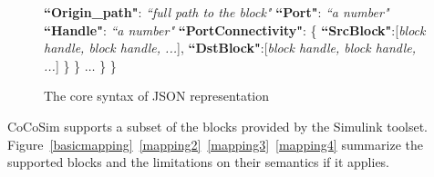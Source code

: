 \documentclass{article}
\begin{document}
\begin{figure}
\begin{algorithmic}
{\State {\ \ \ \ \ \ \ \ \ \ \ \ } \textbf{``Origin\_path"}: \textit{``full path to the block"} 
\State {\ \ \ \ \ \ \ \ \ \ \ \ } \textbf{``Port"}: \textit{``a number"} 
\State {\ \ \ \ \ \ \ \ \ \ \ \ } \textbf{``Handle"}: \textit{``a number"} 		   
\State {\ \ \ \ \ \ \ \ \ \ \ \ } \textbf{``PortConnectivity"}: \{ 
\State {\ \ \ \ \ \ \ \ \ \ \ \ \ \ \ \ } \textbf{``SrcBlock"}:[\textit{block handle, block handle, ...}], 
\State {\ \ \ \ \ \ \ \ \ \ \ \ \ \ \ \ } \textbf{``DstBlock"}:[\textit{block handle, block handle, ...}]		
\State {\ \ \ \ \ \ \ \ \ \ \ \ }\}	
\State {\ \ \ \ \ \ \ \ } \}
\State {\ \ \ \ \ \ \ \ } $\ldots$
\State {\ \ \ \ }\}
\State \}}
\end{algorithmic}
\caption{The core syntax of JSON representation}
\label{jsonsyntax}
\end{figure}


CoCoSim supports a subset of the blocks provided by the Simulink toolset. Figure~\ref{basicmapping}~\ref{mapping2}~\ref{mapping3}~\ref{mapping4} summarize the supported blocks and the limitations on their semantics if it applies. 
\end{document}
